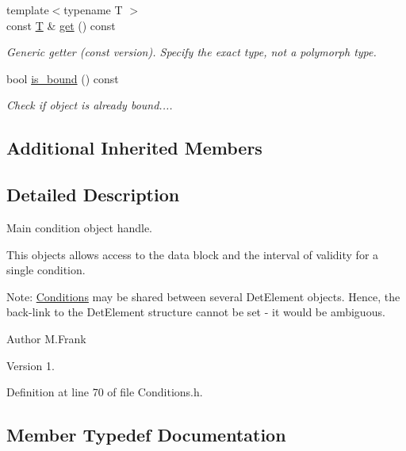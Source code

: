 \begin{DoxyCompactItemize}
{\footnotesize template$<$typename T $>$ }\\const \hyperlink{class_t}{T} \& \hyperlink{class_d_d4hep_1_1_conditions_1_1_condition_af346e01c6a0073f16a392f67088c260c}{get} () const
\begin{DoxyCompactList}\small\item\em Generic getter (const version). Specify the exact type, not a polymorph type. \end{DoxyCompactList}\item 
bool \hyperlink{class_d_d4hep_1_1_conditions_1_1_condition_a62cd8b120f5c485286d371e499ba8468}{is\+\_\+bound} () const
\begin{DoxyCompactList}\small\item\em Check if object is already bound.... \end{DoxyCompactList}\end{DoxyCompactItemize}
\subsection*{Additional Inherited Members}


\subsection{Detailed Description}
Main condition object handle. 

This objects allows access to the data block and the interval of validity for a single condition.

Note\+: \hyperlink{namespace_d_d4hep_1_1_conditions}{Conditions} may be shared between several Det\+Element objects. Hence, the back-\/link to the Det\+Element structure cannot be set -\/ it would be ambiguous.

\begin{DoxyAuthor}{Author}
M.\+Frank 
\end{DoxyAuthor}
\begin{DoxyVersion}{Version}
1. 
\end{DoxyVersion}


Definition at line 70 of file Conditions.\+h.



\subsection{Member Typedef Documentation}
\hypertarget{class_d_d4hep_1_1_conditions_1_1_condition_ad84300e226b2085ec5e9db7f47be5539}{}\label{class_d_d4hep_1_1_conditions_1_1_condition_ad84300e226b2085ec5e9db7f47be5539} 
